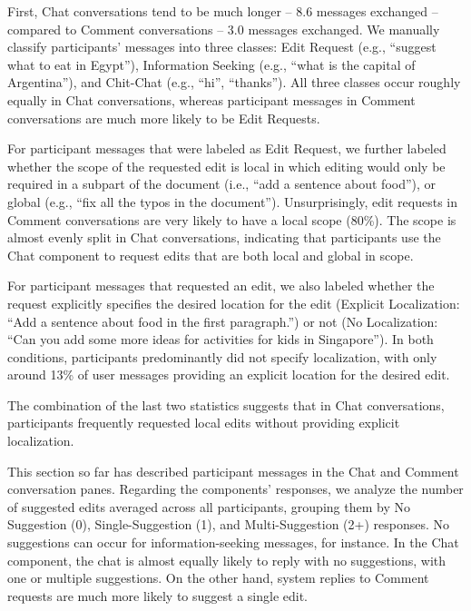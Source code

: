 \documentclass[manuscript]{acmart}
\begin{document}
First, Chat conversations tend to be much longer -- 8.6 messages exchanged -- compared to Comment conversations -- 3.0 messages exchanged. We manually classify participants' messages into three classes: Edit Request (e.g., ``suggest what to eat in Egypt''), Information Seeking (e.g., ``what is the capital of Argentina''), and Chit-Chat (e.g., ``hi'', ``thanks''). All three classes occur roughly equally in Chat conversations, whereas participant messages in Comment conversations are much more likely to be Edit Requests.

For participant messages that were labeled as Edit Request, we further labeled whether the scope of the requested edit is local in which editing would only be required in a subpart of the document (i.e., ``add a sentence about food''), or global (e.g., ``fix all the typos in the document''). Unsurprisingly, edit requests in Comment conversations are very likely to have a local scope (80\%). The scope is almost evenly split in Chat conversations, indicating that participants use the Chat component to request edits that are both local and global in scope.

For participant messages that requested an edit, we also labeled whether the request explicitly specifies the desired location for the edit (Explicit Localization: ``Add a sentence about food in the first paragraph.'') or not (No Localization: ``Can you add some more ideas for activities for kids in Singapore''). In both conditions, participants predominantly did not specify localization, with only around 13\% of user messages providing an explicit location for the desired edit.

The combination of the last two statistics suggests that in Chat conversations, participants frequently requested local edits without providing explicit localization.

This section so far has described participant messages in the Chat and Comment conversation panes. Regarding the components' responses, we analyze the number of suggested edits averaged across all participants, grouping them by No Suggestion (0), Single-Suggestion (1), and Multi-Suggestion (2+) responses. No suggestions can occur for information-seeking messages, for instance. In the Chat component, the chat is almost equally likely to reply with no suggestions, with one or multiple suggestions. On the other hand, system replies to Comment requests are much more likely to suggest a single edit.
\end{document}
